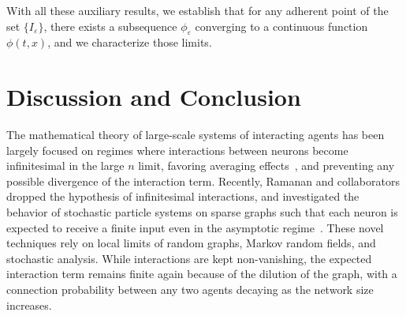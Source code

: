 \documentclass[onefignum,onetabnum]{siamart190516}
\newcommand{\1}{\mathbbm{1}}
\newcommand{\eps}{\varepsilon}
\newcommand{\review}[1]{\textcolor{midblue}{ #1}}
\renewcommand{\review}[1]{{ #1}}
\begin{document}
{{With all these auxiliary results, we establish that for any adherent point of the set $\{I_\varepsilon\}$, there exists a subsequence $\phi_{\eps}$ converging to a continuous function $\phi(t,x)$, and we characterize those limits.}
\color{black}}



\section{Discussion and Conclusion}
\review{The mathematical theory of large-scale systems of interacting agents has been largely focused on regimes where interactions between neurons become infinitesimal in the large $n$ limit, favoring averaging effects~\cite{arous1995large,arous1997symmetric,baladron2011mean,cabana1,cabana2,robert2014dynamics}, and preventing any possible divergence of the interaction term. Recently, Ramanan and collaborators dropped the hypothesis of infinitesimal interactions, and investigated the behavior of stochastic particle systems on sparse graphs such that each neuron is expected to receive a finite input even in the asymptotic regime~\cite{ramanan2023interacting,ramanan2023large,ganguly2024hydrodynamic,lacker2023local,ramanan2022beyond}. These novel techniques rely on local limits of random graphs, Markov random fields, and stochastic analysis. While interactions are kept non-vanishing, the expected interaction term remains finite again because of the dilution of the graph, with a connection probability between any two agents decaying as the network size increases.}
\end{document}
